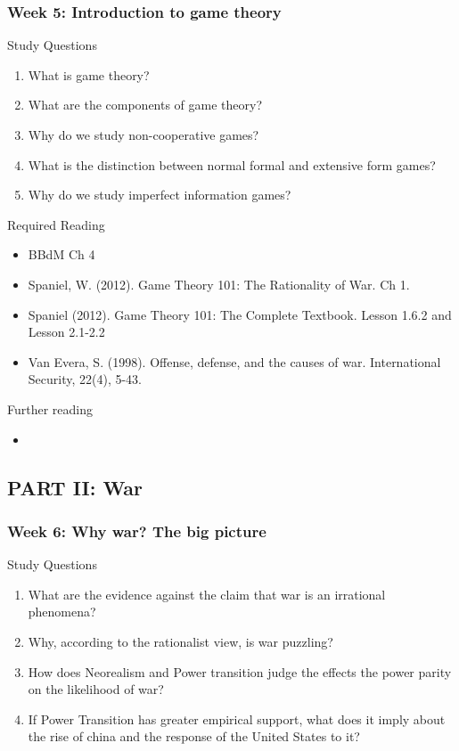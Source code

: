 \documentclass[12pt,a4paper]{article}
\begin{document}
\subsubsection*{Week 5: Introduction to game theory} 

Study Questions

\begin{enumerate}
	\item What is game theory?
	\item What are the components of game theory?
	\item Why do we study non-cooperative games?
	\item What is the distinction between normal formal and extensive form games?
	\item Why do we study imperfect information games?
\end{enumerate}

\noindent Required Reading

\begin{itemize}
	\item BBdM Ch 4
	\item Spaniel, W. (2012). Game Theory 101: The Rationality of War. Ch 1.
	\item Spaniel (2012). Game Theory 101: The Complete Textbook. Lesson 1.6.2 and Lesson 2.1-2.2
	\item Van Evera, S. (1998). Offense, defense, and the causes of war. International Security, 22(4), 5-43.
\end{itemize}

\noindent Further reading

\begin{itemize}
	\item 
\end{itemize}

\subsection*{PART II: War}

\subsubsection*{Week 6: Why war? The big picture}

Study Questions

\begin{enumerate}
	\item What are the evidence against the claim that war is an irrational phenomena?
	\item Why, according to the rationalist view, is war puzzling?
	\item How does Neorealism and Power transition judge the effects the power parity on the likelihood of war?
	\item If Power Transition has greater empirical support, what does it imply about the rise of china and the response of the United States to it?
\end{enumerate}
\end{document}
